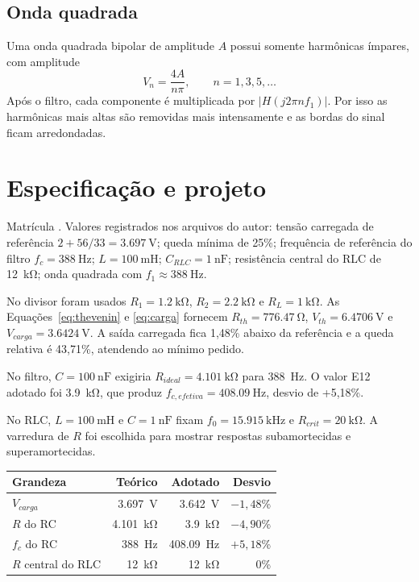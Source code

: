 \documentclass[11pt,a4paper]{article}
\begin{document}
\subsection{Onda quadrada}

Uma onda quadrada bipolar de amplitude $A$ possui somente harmônicas ímpares, com amplitude
\begin{equation}
V_n=\frac{4A}{n\pi}, \qquad n=1,3,5,\ldots
\label{eq:fourier}
\end{equation}
Após o filtro, cada componente é multiplicada por $|H(j2\pi nf_1)|$. Por isso as harmônicas mais
altas são removidas mais intensamente e as bordas do sinal ficam arredondadas.

\section{Especificação e projeto}

\begin{espec}
Matrícula . Valores registrados nos arquivos do autor: tensão carregada de
referência $2+56/33=\SI{3,697}{\volt}$; queda mínima de 25\%; frequência de referência do filtro
$f_c=\SI{388}{\hertz}$; $L=\SI{100}{\milli\henry}$; $C_{RLC}=\SI{1}{\nano\farad}$; resistência
central do RLC de \SI{12}{\kilo\ohm}; onda quadrada com $f_1\approx\SI{388}{\hertz}$.
\end{espec}

No divisor foram usados $R_1=\SI{1,2}{\kilo\ohm}$, $R_2=\SI{2,2}{\kilo\ohm}$ e
$R_L=\SI{1}{\kilo\ohm}$. As Equações~\ref{eq:thevenin} e \ref{eq:carga} fornecem
$R_{th}=\SI{776,47}{\ohm}$, $V_{th}=\SI{6,4706}{\volt}$ e
$V_{carga}=\SI{3,6424}{\volt}$. A saída carregada fica 1,48\% abaixo da referência e a queda
relativa é 43,71\%, atendendo ao mínimo pedido.

No filtro, $C=\SI{100}{\nano\farad}$ exigiria $R_{ideal}=\SI{4,101}{\kilo\ohm}$ para
\SI{388}{\hertz}. O valor E12 adotado foi \SI{3,9}{\kilo\ohm}, que produz
$f_{c,efetiva}=\SI{408,09}{\hertz}$, desvio de +5,18\%.

No RLC, $L=\SI{100}{\milli\henry}$ e $C=\SI{1}{\nano\farad}$ fixam
$f_0=\SI{15,915}{\kilo\hertz}$ e $R_{crit}=\SI{20}{\kilo\ohm}$. A varredura de $R$ foi escolhida
para mostrar respostas subamortecidas e superamortecidas.

\begin{center}
\begin{tabular}{@{}lrrr@{}}
\toprule
\textbf{Grandeza} & \textbf{Teórico} & \textbf{Adotado} & \textbf{Desvio} \\
\midrule
$V_{carga}$ & \SI{3,697}{\volt} & \SI{3,642}{\volt} & $-1,48$\% \\
$R$ do RC & \SI{4,101}{\kilo\ohm} & \SI{3,9}{\kilo\ohm} & $-4,90$\% \\
$f_c$ do RC & \SI{388}{\hertz} & \SI{408,09}{\hertz} & $+5,18$\% \\
$R$ central do RLC & \SI{12}{\kilo\ohm} & \SI{12}{\kilo\ohm} & 0\% \\
\bottomrule
\end{tabular}
\end{center}
\end{document}
